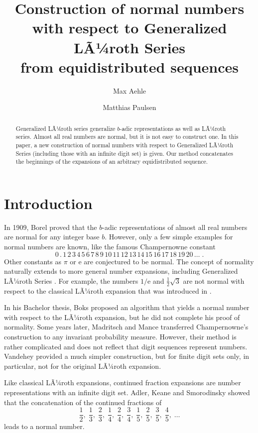 \documentclass{amsart}
\title[Normal numbers from equidistributed sequences]{Construction of normal numbers \\ with respect to Generalized LÃ¼roth Series \\ from equidistributed sequences}
\author{Max Aehle}
\author{Matthias Paulsen}
\theoremstyle{definition}
\theoremstyle{remark}
\begin{document}
\begin{abstract}
Generalized LÃ¼roth series generalize $b$-adic representations as well as
LÃ¼roth series.
Almost all real numbers are normal, but it is not easy to construct one.
In this paper, a new construction of normal numbers with respect to Generalized LÃ¼roth Series (including those with an infinite digit set) is given. Our method concatenates the beginnings of the expansions of an arbitrary equidistributed sequence.
\end{abstract}

\maketitle

\section{Introduction}\label{sect:intro}
In 1909, Borel proved that the $b$-adic representations of almost all real numbers are normal for any integer base $b$. However, only a few simple examples for normal numbers are known, like the famous Champernowne constant \cite{champ}
\[ 0\,.\,1\,2\,3\,4\,5\,6\,7\,8\,9\,10\,11\,12\,13\,14\,15\,16\,17\,18\,19\,20\,\dots \;. \]
Other constants as $\pi$ or $\mathrm e$ are conjectured to be normal.
The concept of normality naturally extends to more general number expansions, including Generalized LÃ¼roth Series \cite[pp.~41--50]{def-gls}. For example, the numbers $1/\mathrm e$ and $\frac12\sqrt3$ are not normal with respect to the classical LÃ¼roth expansion that was introduced in \cite{lueroth}.

In his Bachelor thesis, Boks \cite{boks} proposed an algorithm that yields a normal number with respect to the LÃ¼roth expansion, but he did not complete his proof of normality. Some years later, Madritsch and Mance \cite{mu-normal} transferred Champernowne's construction to any invariant probability measure. However, their method is rather complicated and does not reflect that digit sequences represent numbers. Vandehey \cite{vandehey} provided a much simpler construction, but for finite digit sets only, in particular, not for the original LÃ¼roth expansion.

Like classical LÃ¼roth expansions, continued fraction expansions are number representations with an infinite digit set. Adler, Keane and Smorodinsky \cite{cfrac} showed that the concatenation of the continued fractions of
\begin{equation}
\frac12,\;\frac13,\;\frac23,\;\frac14,\;\frac24,\;\frac34,\;\frac15,\;\frac25,\;\frac35,\;\frac45,\;\dots \label{eq:cfrac}
\end{equation}
leads to a normal number.
\end{document}
